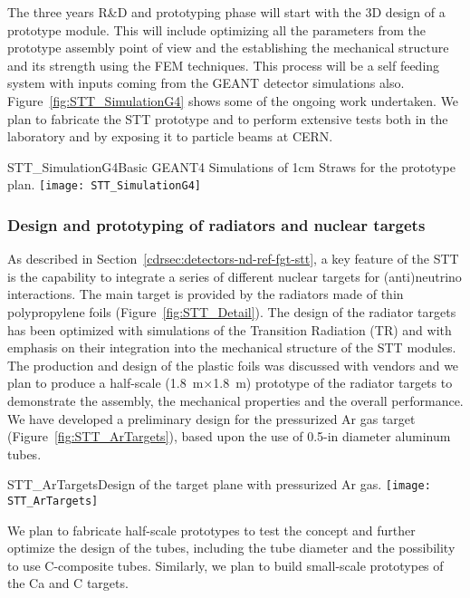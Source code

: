 The three years R\&D and prototyping phase will start with the 3D design of a prototype module. 
This will include optimizing all the parameters from the prototype assembly point of view and the 
establishing the mechanical structure and its strength using the FEM techniques. This process will 
be a self feeding system with inputs coming from the GEANT detector simulations also. 
Figure~\ref{fig:STT_SimulationG4} shows some of the ongoing work undertaken. We plan to fabricate the STT 
prototype and to perform extensive tests both in the laboratory and by 
exposing it to particle beams at CERN. 

\begin{cdrfigure} 
{STT_SimulationG4}{Basic GEANT4 Simulations of 1cm Straws for the prototype plan.}
\texttt{[image: STT\_SimulationG4]}
\end{cdrfigure}


\subsubsection{Design and prototyping of radiators and nuclear targets} 

As described in Section~\ref{cdrsec:detectors-nd-ref-fgt-stt}, a key
feature of the STT is the capability to integrate a series of
different nuclear targets for (anti)neutrino interactions.  The main
target is provided by the radiators made of thin polypropylene foils
(Figure~\ref{fig:STT_Detail}).  The design of the radiator targets has
been optimized with simulations of the Transition Radiation (TR) and
with emphasis on their integration into the mechanical structure of
the STT modules.  The production and design of the plastic foils was
discussed with vendors and we plan to produce a half-scale
(1.8~m$\times$1.8~m) prototype of the radiator targets to demonstrate
the assembly, the mechanical properties and the overall
performance. We have developed a preliminary design for the
pressurized Ar gas target (Figure~\ref{fig:STT_ArTargets}), based upon
the use of 0.5-in diameter aluminum tubes.  
\begin{cdrfigure} 
{STT_ArTargets}{Design of the target plane with pressurized Ar gas.}
\texttt{[image: STT\_ArTargets]}
\end{cdrfigure}
We plan to fabricate half-scale prototypes to test the concept and
further optimize the design of the tubes, including the tube diameter
and the possibility to use C-composite tubes.  Similarly, we plan to
build small-scale prototypes of the Ca and C targets.


